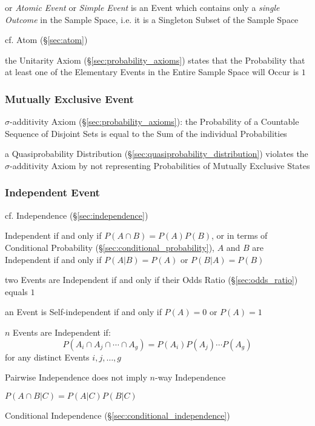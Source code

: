 or \emph{Atomic Event} or \emph{Simple Event} is an Event which contains only a
\emph{single Outcome} in the Sample Space, i.e. it is a Singleton Subset of the
Sample Space

cf. Atom (\S\ref{sec:atom})

the Unitarity Axiom (\S\ref{sec:probability_axioms}) states that the
Probability that at least one of the Elementary Events in the Entire Sample
Space will Occur is $1$



\subsubsection{Mutually Exclusive Event}\label{sec:mutually_exclusive}

$\sigma$-additivity Axiom (\S\ref{sec:probability_axioms}): the Probability of
a Countable Sequence of Disjoint Sets is equal to the Sum of the individual
Probabilities

a Quasiprobability Distribution (\S\ref{sec:quasiprobability_distribution})
violates the $\sigma$-additivity Axiom by not representing Probabilities of
Mutually Exclusive States



\subsubsection{Independent Event}\label{sec:independent_event}

\fist cf. Independence (\S\ref{sec:independence})

Independent if and only if $P(A \cap B) = P(A) P(B)$, or in terms of Conditional
Probability (\S\ref{sec:conditional_probability}), $A$ and $B$ are Independent
if and only if $P(A|B) = P(A)$ or $P(B|A) = P(B)$

\fist two Events are Independent if and only if their Odds Ratio
(\S\ref{sec:odds_ratio}) equals $1$

an Event is Self-independent if and only if $P(A) = 0$ or $P(A) = 1$

$n$ Events are Independent if:
\[
  P(A_i \cap A_j \cap \cdots \cap A_g) = P(A_i)P(A_j) \cdots P(A_g)
\]
for any distinct Events $i,j,\ldots,g$

Pairwise Independence does not imply $n$-way Independence

$P(A \cap B | C) = P(A|C)P(B|C)$

\fist Conditional Independence (\S\ref{sec:conditional_independence})


